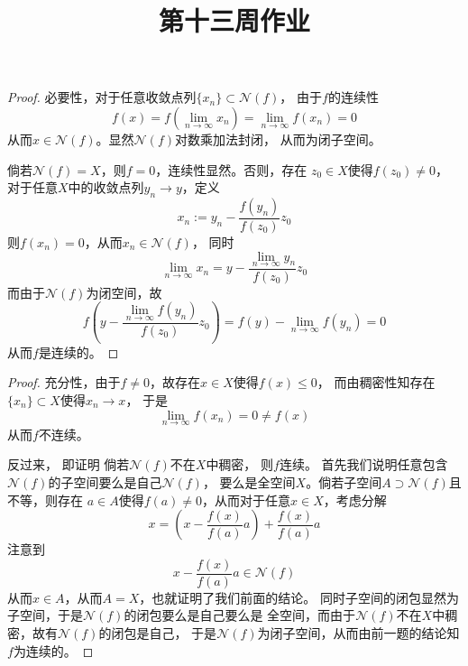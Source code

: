 \documentclass[cn]{homework}
\title{第十三周作业}
\begin{document}
    \maketitle
    
    \problem
    \begin{subproblem}[(\arabic*)]
        \item
        \begin{proof}
            必要性，对于任意收敛点列$\{x_n\}\subset\mathcal N(f)$，
            由于$f$的连续性
            \[f(x)=f(\lim_{n\to\infty}x_n)=\lim_{n\to\infty}f(x_n)=0\]
            从而$x\in\mathcal N(f)$。显然$\mathcal N(f)$对数乘加法封闭，
            从而为闭子空间。
            
            倘若$\mathcal N(f)=X$，则$f=0$，连续性显然。否则，存在
            $z_0\in X$使得$f(z_0)\neq 0$，
            对于任意$X$中的收敛点列$y_n\to y$，定义
            \[x_n:=y_n-\frac{f(y_n)}{f(z_0)}z_0\]
            则$f(x_n)=0$，从而$x_n\in\mathcal N(f)$，
            同时
            \[\lim_{n\to\infty} x_n=y-\frac{\displaystyle\lim_{n\to\infty}y_n}{f(z_0)}z_0\]
            而由于$\mathcal N(f)$为闭空间，故
            \[f\left(y-\frac{\displaystyle\lim_{n\to\infty}f(y_n)}{f(z_0)}z_0\right)
            =f(y)-\lim_{n\to\infty}f(y_n)=0\]
            从而$f$是连续的。
        \end{proof}

        \item
        \begin{proof}
            充分性，由于$f\neq 0$，故存在$x\in X$使得$f(x)\leq 0$，
            而由稠密性知存在$\{x_n\}\subset X$使得$x_n\to x$，
            于是
            \[\lim_{n\to\infty}f(x_n)=0\neq f(x)\]
            从而$f$不连续。

            反过来，
            即证明
            倘若$\mathcal N(f)$不在$X$中稠密，
            则$f$连续。
            首先我们说明任意包含$\mathcal N(f)$的子空间要么是自己$\mathcal N(f)$，
            要么是全空间$X$。倘若子空间$A\supset\mathcal N(f)$且不等，则存在
            $a\in A$使得$f(a)\neq 0$，从而对于任意$x\in X$，考虑分解
            \[x=\left(x-\frac{f(x)}{f(a)}a\right)+\frac{f(x)}{f(a)}a\]
            注意到
            \[x-\frac{f(x)}{f(a)}a\in\mathcal N(f)\]
            从而$x\in A$，从而$A=X$，也就证明了我们前面的结论。
            同时子空间的闭包显然为子空间，于是$\mathcal N(f)$的闭包要么是自己要么是
            全空间，而由于$\mathcal N(f)$不在$X$中稠密，故有$\mathcal N(f)$的闭包是自己，
            于是$\mathcal N(f)$为闭子空间，从而由前一题的结论知$f$为连续的。
        \end{proof}
    \end{subproblem}
\end{document}
